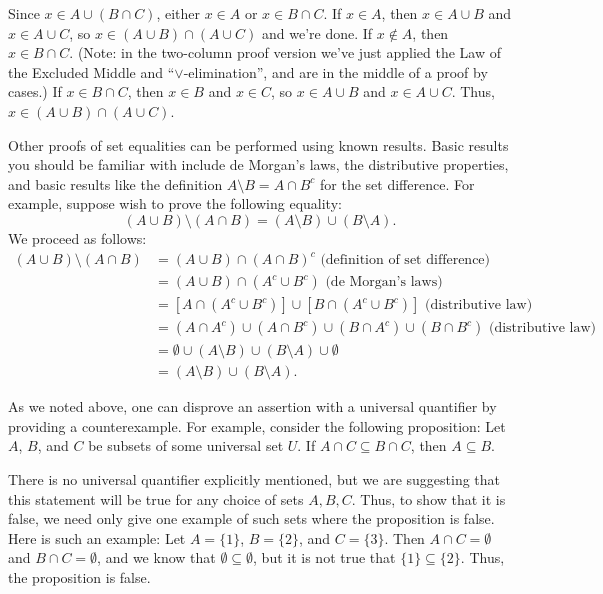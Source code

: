 \documentclass[letterpaper,12pt]{article}
\begin{document}
Since $x\in A\cup (B\cap C)$, either $x\in A$ or $x\in B\cap C$. If $x\in A$, then $x\in A\cup B$ and $x\in A\cup C$, so $x\in (A\cup B)\cap (A\cup C)$ and we're done. If $x\notin A$, then $x\in B\cap C$. (Note: in the two-column proof version we've just applied the Law of the Excluded Middle and ``$\vee$-elimination'', and are in the middle of a proof by cases.) If $x\in B\cap C$, then $x\in B$ and $x\in C$, so $x\in A\cup B$ and $x\in A\cup C$. Thus, $x\in (A\cup B)\cap (A\cup C)$.

Other proofs of set equalities can be performed using known results. Basic results you should be familiar with include de Morgan's laws, the distributive properties, and basic results like the definition $A\setminus B = A\cap B^c$ for the set difference. For example, suppose wish to prove the following equality:
\[
(A\cup B)\setminus (A\cap B) = (A\setminus B)\cup (B\setminus A).
\]
We proceed as follows:
\begin{align*}
(A\cup B)\setminus (A\cap B) & = (A\cup B)\cap (A\cap B)^c \text{ (definition of set difference)}\\
& = (A\cup B)\cap (A^c\cup B^c) \text{ (de Morgan's laws)}\\
& = [A\cap (A^c\cup B^c)]\cup [B\cap (A^c\cup B^c)] \text{ (distributive law)}\\
& = (A\cap A^c)\cup (A\cap B^c)\cup (B\cap A^c)\cup (B\cap B^c) \text{ (distributive law)}\\
& = \emptyset\cup (A\setminus B)\cup (B\setminus A)\cup \emptyset\\
& = (A\setminus B)\cup (B\setminus A).
\end{align*}

As we noted above, one can disprove an assertion with a universal quantifier by providing a counterexample. For example, consider the following proposition: Let $A$, $B$, and $C$ be subsets of some universal set $U$. If $A\cap C\subseteq B\cap C$, then $A\subseteq B$.

There is no universal quantifier explicitly mentioned, but we are suggesting that this statement will be true for any choice of sets $A,B,C$. Thus, to show that it is false, we need only give one example of such sets where the proposition is false. Here is such an example: Let $A=\{1\}$, $B=\{2\}$, and $C=\{3\}$. Then $A\cap C = \emptyset$ and $B\cap C=\emptyset$, and we know that $\emptyset\subseteq \emptyset$, but it is not true that $\{1\}\subseteq \{2\}$. Thus, the proposition is false.
\end{document}
